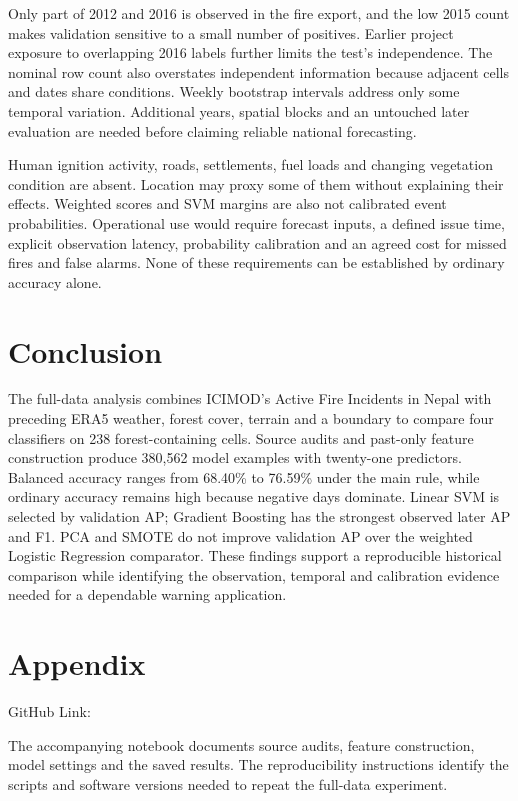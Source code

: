 \documentclass[conference,a4paper]{IEEEtran}
\begin{document}
Only part of 2012 and 2016 is observed in the fire export, and the low 2015 count makes validation sensitive to a small number of positives. Earlier project exposure to overlapping 2016 labels further limits the test's independence. The nominal row count also overstates independent information because adjacent cells and dates share conditions. Weekly bootstrap intervals address only some temporal variation. Additional years, spatial blocks and an untouched later evaluation are needed before claiming reliable national forecasting.

Human ignition activity, roads, settlements, fuel loads and changing vegetation condition are absent. Location may proxy some of them without explaining their effects. Weighted scores and SVM margins are also not calibrated event probabilities. Operational use would require forecast inputs, a defined issue time, explicit observation latency, probability calibration and an agreed cost for missed fires and false alarms. None of these requirements can be established by ordinary accuracy alone.

\section{Conclusion}
The full-data analysis combines ICIMOD's Active Fire Incidents in Nepal with preceding ERA5 weather, forest cover, terrain and a boundary to compare four classifiers on 238 forest-containing cells. Source audits and past-only feature construction produce 380,562 model examples with twenty-one predictors. Balanced accuracy ranges from 68.40\% to 76.59\% under the main rule, while ordinary accuracy remains high because negative days dominate. Linear SVM is selected by validation AP; Gradient Boosting has the strongest observed later AP and F1. PCA and SMOTE do not improve validation AP over the weighted Logistic Regression comparator. These findings support a reproducible historical comparison while identifying the observation, temporal and calibration evidence needed for a dependable warning application.


\section*{Appendix}
\noindent GitHub Link:

\noindent The accompanying notebook documents source audits, feature construction, model settings and the saved results. The reproducibility instructions identify the scripts and software versions needed to repeat the full-data experiment.
\end{document}
